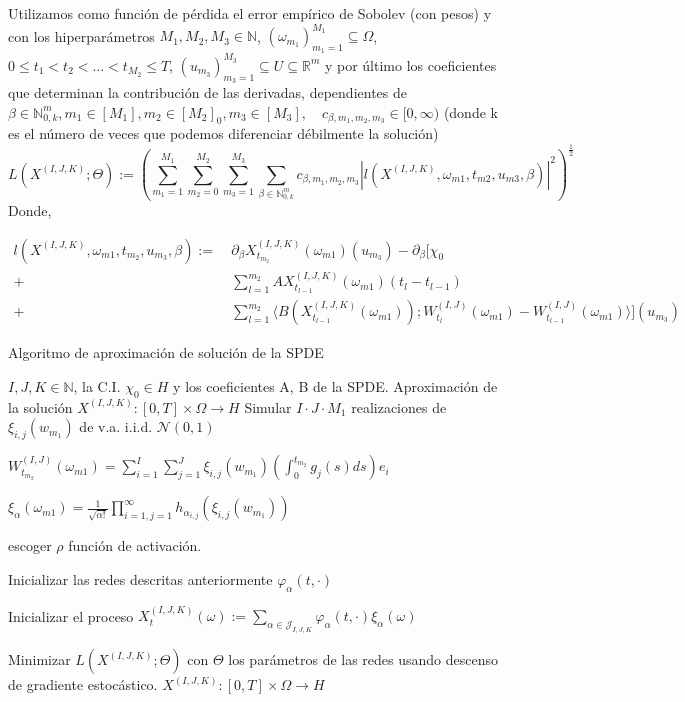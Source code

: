 Utilizamos como función de pérdida el error empírico de Sobolev (con pesos) y con los hiperparámetros $M_1,M_2, M_3 \in \mathbb{N}$, $(\omega_{m_1})_{m_1=1}^{M_1} \subseteq \Omega$, $0 \leq t_1 < t_2 < \dots < t_{M_2} \leq T$, $(u_{m_3})_{m_3=1}^{M_3} \subseteq U \subseteq \mathbb{R}^m$ y por último los coeficientes que determinan la contribución de las derivadas, dependientes de $\beta \in \mathbb{N}_{0,k}^m,m_1 \in [M_1],m_2 \in [M_2]_0, m_3 \in [M_3],\quad c_{\beta,m_1,m_2,m_3} \in [0,\infty)$  (donde k es el número de veces que podemos diferenciar débilmente la solución)
\[
  L(X^{(I,J,K)};\Theta) := (\sum_{m_1=1}^{M_1}\sum_{m_2=0}^{M_2}\sum_{m_3=1}^{M_3}\sum_{\beta \in \mathbb{N}_{0,k}^m} c_{\beta,m_1,m_2,m_3} |l(X^{(I,J,K)},\omega_{m1},t_{m2},u_{m3},\beta)|^2)^{\frac{1}{2}}
\]
Donde,

\begin{align*}
  l(X^{(I,J,K)},\omega_{m1},t_{m_2},u_{m_3},\beta) :=\ & \partial_{\beta}X^{(I,J,K)}_{t_{m_2}}(\omega_{m1})(u_{m_3}) - \partial_{\beta}[\chi_0\\
    +\ & \sum_{l=1}^{m_2} AX^{(I,J,K)}_{t_{l-1}}(\omega_{m1}) (t_{l} - t_{l-1})\\
  +\ & \sum_{l=1}^{m_2} \langle B(X^{(I,J,K)}_{t_{l-1}}(\omega_{m1})); W^{(I,J)}_{t_{l}}(\omega_{m1}) - W^{(I,J)}_{t_{l-1}}(\omega_{m1}) \rangle ](u_{m_3})
\end{align*}

\begin{algorithm}
  \caption{Algoritmo de aproximación de solución de la SPDE}
  \label{alg:algoritmo_redes}
  \begin{algorithmic}[1]
    \Require $I,J,K \in \mathbb{N}$, la C.I. $\chi_0 \in H$ y los coeficientes A, B de la SPDE.
    \Ensure Aproximación de la solución $X^{(I,J,K)}: [0,T] \times \Omega \rightarrow H$
    \State Simular $I \cdot J \cdot M_1 $ realizaciones de $\xi_{i,j}(w_{m_1})$ de v.a. i.i.d. $\mathcal{N}(0,1)$

    \State $W^{(I,J)}_{t_{m_2}}(\omega_{m1}) = \sum_{i=1}^{I}\sum_{j=1}^{J}\xi_{i,j}(w_{m_1})(\int_0^{t_{m_2}}g_j(s)ds) e_i$
    \EndFor

    \State $\xi_{\alpha}(\omega_{m1}) = \frac{1}{\sqrt{\alpha!}} \prod_{i=1,j=1}^{\infty} h_{\alpha_{i,j}}(\xi_{i,j}(w_{m_1}))$
    \EndFor

    \State escoger $\rho$ función de activación.

    \State Inicializar las redes descritas anteriormente $\varphi_{\alpha}(t,\cdot)$
    \EndFor

    \State Inicializar el proceso $X_t^{(I,J,K)}(\omega) := \sum_{\alpha \in \mathcal{J}_{I, J, K}} \varphi_\alpha(t, \cdot) \xi_\alpha(\omega)$

    \State Minimizar $L(X^{(I,J,K)};\Theta)$ con $\Theta$ los parámetros de las redes usando descenso de gradiente estocástico.
    \State \Return $X^{(I,J,K)}: [0,T] \times \Omega \rightarrow H$
  \end{algorithmic}
\end{algorithm}
